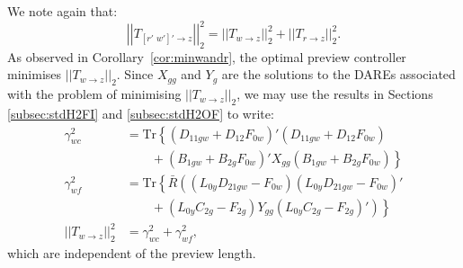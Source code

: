 \documentclass[a4paper,12pt]{article}
\theoremstyle{remark}
\newcommand{\nrm}[1]{\left|\left| #1 \right|\right|}
\newcommand{\als}[1]{\begin{align*} #1 \end{align*}}
\begin{document}
We note again that:
% 
\begin{equation}
\nrm{T_{{[r'\,\,w']'}\rightarrow z}}^2_2 =
\nrm{T_{w\rightarrow z}}^2_2+
\nrm{T_{r\rightarrow z}}^2_2. \label{proj_prop}
\end{equation}
%
As observed in Corollary~\ref{cor:minwandr}, the optimal preview controller minimises $\nrm{T_{w\rightarrow z}}_2$. Since $X_{gg}$ and $Y_g$ are the solutions to the DAREs associated with the problem of minimising $\nrm{T_{w\rightarrow z}}_2$, we may use the results in Sections \ref{subsec:stdH2FI} and \ref{subsec:stdH2OF} to write:
\als{
\gamma_{wc}^2&=\textrm{Tr}\left\{(D_{11gw}+D_{12}F_{0w})'(D_{11gw}+D_{12}F_{0w})\right.\\ &\left.\qquad+(B_{1gw}+B_{2g}F_{0w})'X_{gg}(B_{1gw}+B_{2g}F_{0w})\right\}\\
\gamma_{wf}^2&=\textrm{Tr}\left\{\bar R\left( (L_{0y}D_{21gw}-F_{0w})(L_{0y}D_{21gw}-F_{0w})'\right.\right.\\ &\left.\left.\qquad+(L_{0y}C_{2g}-F_{2g})Y_{gg}(L_{0y}C_{2g}-F_{2g})'\right) \right\}\\
\nrm{T_{w\rightarrow z}}^2_2&=\gamma_{wc}^2+\gamma_{wf}^2,
} 
which are independent of the preview length.
\end{document}
